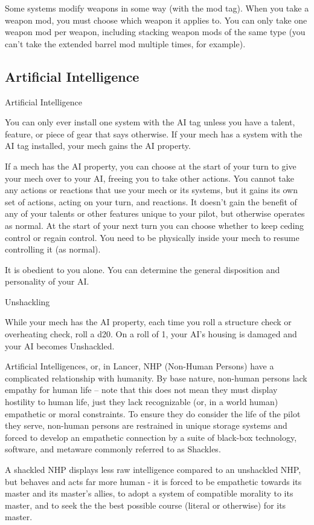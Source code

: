 Some systems modify weapons in some way (with the mod tag). When you take a weapon mod,
you must choose which weapon it applies to. You can only take one weapon mod per weapon,
including stacking weapon mods of the same type (you can't take the extended barrel mod
multiple times, for example).

\subsection{Artificial Intelligence}
\hypertarget{AI}{Artificial Intelligence}

You can only ever install one system with the AI tag unless you have a talent, feature, or piece
of gear that says otherwise. If your mech has a system with the AI tag installed, your mech gains
the AI property.

If a mech has the AI property, you can choose at the start of your turn to give your mech over to
your AI, freeing you to take other actions. You cannot take any actions or reactions that use your
mech or its systems, but it gains its own set of actions, acting on your turn, and reactions. It
doesn't gain the benefit of any of your talents or other features unique to your pilot, but
otherwise operates as normal. At the start of your next turn you can choose whether to keep
ceding control or regain control. You need to be physically inside your mech to resume
controlling it (as normal).


It is obedient to you alone. You can determine the general disposition and personality of your AI.

Unshackling

While your mech has the AI property, each time you roll a structure check or overheating
check, roll a d20. On a roll of 1, your AI's housing is damaged and your AI becomes Unshackled.


Artificial Intelligences, or, in Lancer, NHP (Non-Human Persons) have a complicated relationship
with humanity. By base nature, non-human persons lack empathy for human life -- note that this
does not mean they must display hostility to human life, just they lack recognizable (or, in a world
human) empathetic or moral constraints. To ensure they do consider the life of the pilot they
serve, non-human persons are restrained in unique storage systems and forced to develop an
empathetic connection by a suite of black-box technology, software, and metaware commonly
referred to as Shackles.


A shackled NHP displays less raw intelligence compared to an unshackled NHP, but behaves
and acts far more human - it is forced to be empathetic towards its master and its master's allies,
to adopt a system of compatible morality to its master, and to seek the the best possible course
(literal or otherwise) for its master.


